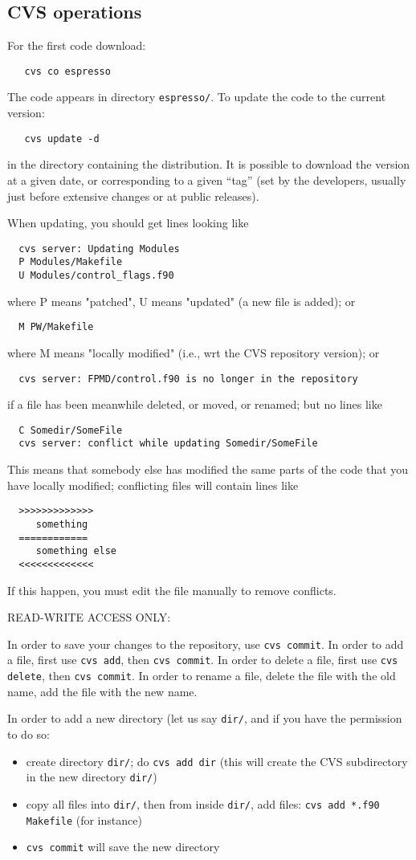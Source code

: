 \documentclass[12pt,a4paper]{article}
\begin{document}
\subsection{CVS operations}

For the first code download:
\begin{verbatim}
   cvs co espresso
\end{verbatim}
The code appears in directory \texttt{espresso/}.
To update the code to the current version:
\begin{verbatim}
   cvs update -d
\end{verbatim}
in the directory containing the distribution. It is possible 
to download the version at a given date, or corresponding to 
a given ``tag'' (set by the developers, usually just before 
extensive changes or at public releases).

When updating, you should get lines looking like
\begin{verbatim}
  cvs server: Updating Modules
  P Modules/Makefile
  U Modules/control_flags.f90
\end{verbatim}
where P means "patched", U means "updated" (a new file is added); or
\begin{verbatim}
  M PW/Makefile
\end{verbatim}
where M means "locally modified" (i.e., wrt the CVS repository
version); or
\begin{verbatim}
  cvs server: FPMD/control.f90 is no longer in the repository
\end{verbatim}
if a file has been meanwhile deleted, or moved, or renamed; but no lines like
\begin{verbatim}
  C Somedir/SomeFile
  cvs server: conflict while updating Somedir/SomeFile
\end{verbatim}
This means that somebody else has modified the same parts of the code 
that you have locally modified; conflicting files will contain lines like
\begin{verbatim}
  >>>>>>>>>>>>>
     something
  ============
     something else
  <<<<<<<<<<<<<
\end{verbatim}
If this happen, you must edit the file manually to remove conflicts.

READ-WRITE ACCESS ONLY:

In order to save your changes to the repository, use
{\tt cvs commit}. In order to add a file, first use
{\tt cvs add}, then {\tt cvs commit}. In order to delete
a file, first use {\tt cvs delete}, then {\tt cvs commit}.
In order to rename a file, delete the file with the old
name, add the file with the new name.

In order to add a new directory (let us say {\tt dir/}, 
and if you have the permission to do so:
\begin{itemize}
\item create directory {\tt dir/}; do {\tt cvs add dir} (this
will create the CVS subdirectory in the new directory {\tt dir/})
\item 
copy all files into {\tt dir/}, then from inside {\tt dir/}, add files:
{\tt cvs add *.f90 Makefile} (for instance)
\item
{\tt cvs commit} will save the new directory
\end{itemize}
\end{document}
